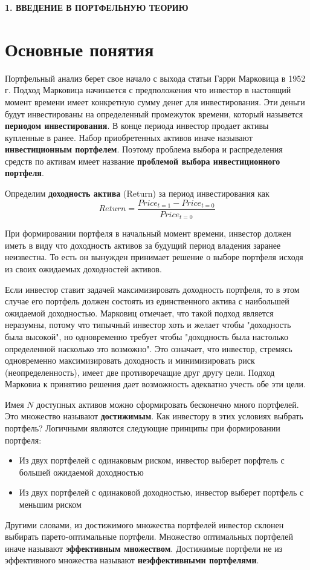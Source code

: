 \newpage
\begin{center}
	\textbf{\large 1. ВВЕДЕНИЕ В ПОРТФЕЛЬНУЮ ТЕОРИЮ}
\end{center}

\section{Основные понятия}

Портфельный анализ берет свое начало с выхода статьи Гарри Марковица в 1952 г. Подход Марковица начинается с предположения что инвестор в 
настоящий момент времени имеет конкретную сумму денег для инвестирования. Эти деньги будут инвестированы на определенный промежуток
времени, который назывется \textbf{периодом инвестирования}. В конце периода инвестор продает активы купленные в
ранее. 
Набор приобретенных активов иначе называют \textbf{инвестиционным портфелем}. Поэтому проблема выбора и распределения
средств по активам имеет название \textbf{проблемой выбора инвестиционного портфеля}.

Определим \textbf{доходность актива} (Return) за период инвестирования как
\[
	Return = \frac{Price_{t=1} - Price_{t=0}}{Price_{t=0}}
\]

При формировании портфеля в начальный момент времени, инвестор должен иметь в виду что доходность активов
за будущий период владения заранее неизвестна. То есть он вынужден принимает решение о выборе портфеля исходя из 
своих ожидаемых доходностей активов. 

Если инвестор ставит задачей максимизировать доходность портфеля, то в этом случае его портфель должен состоять из единственного
актива с наибольшей ожидаемой доходностью. Марковиц отмечает, что такой подход является неразумны, потому что типычный инвестор
хоть и желает чтобы "доходность была высокой", но одновременно требует чтобы "доходность была настолько определенной насколько
это возможно". Это означает, что инвестор, стремясь одновременно максимизировать доходность и минимизировать риск 
(неопределенность), имеет две противоречащие друг другу цели. Подход Марковиа к принятию решения дает возможность адекватно 
учесть обе эти цели.

Имея $N$ доступных активов можно сформировать бесконечно много портфелей. Это множество называют \textbf{достижимым}. 
Как инвестору в этих условиях выбрать портфель? Логичными являются следующие принципы при формировании портфеля:
\begin{itemize}
	\item Из двух портфелей с одинаковым риском, инвестор выберет порфтель с большей ожидаемой доходностью
	\item Из двух портфелей с одинаковой доходностью, инвестор выберет портфель с меньшим риском
\end{itemize}
Другими словами, из достижимого множества портфелей инвестор склонен выбирать парето-оптимальные портфели.
Множество оптимальных портфелей иначе называют \textbf{эффективным множеством}. Достижимые портфели не из 
эффективного множества называют \textbf{неэффективными портфелями}.


